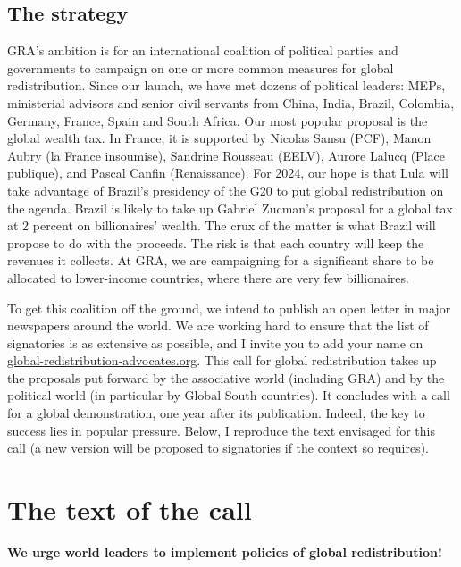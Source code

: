\documentclass[a5paper,english,openany]{memoir}
\begin{document}
\subsection*{The strategy}

GRA's ambition is for an international coalition of political parties and governments to campaign on one or more %
common measures for global redistribution. Since our launch, we have met dozens of political leaders: MEPs, ministerial advisors and senior civil servants %
from China, India, Brazil, Colombia, Germany, France, Spain and South Africa. Our most popular proposal is the global wealth tax. In France, it is supported by Nicolas Sansu (PCF), Manon Aubry (la France insoumise), Sandrine Rousseau (EELV), Aurore Lalucq (Place publique), and Pascal Canfin (Renaissance). %
For 2024, our hope is that Lula will take advantage of Brazil's presidency of the G20 to put global redistribution on the agenda. Brazil is likely to take up Gabriel Zucman's proposal for a global tax at 2 percent on billionaires' wealth. The crux of the matter is what Brazil will propose to do with the proceeds. The risk is that each country will keep the revenues it collects. At GRA, we are campaigning for a significant share to be allocated to lower-income countries, where there are very few billionaires.

To get this coalition off the ground, we intend to publish an open letter in major newspapers around the world. We are working hard to ensure that the list of signatories is as extensive as possible, %
and I invite you to add your name on \href{https://global-redistribution-advocates.org/fr/signer-les-petitions}{global-redistribution-advocates.org}. This call for global redistribution takes up the proposals put forward by the associative world (including GRA) and by the political world (in particular by Global South countries). It concludes with a call for a global demonstration, one year after its publication. Indeed, the key to success lies in popular pressure. Below, I reproduce the text envisaged for this call (a new version will be proposed to signatories if the context so requires).%

\section*{The text of the call}
\begin{center}
\textbf{We urge world leaders to implement policies of global redistribution!}
\end{center}
\end{document}
